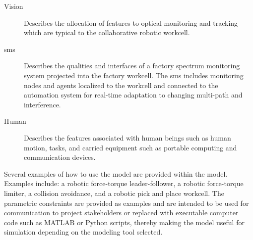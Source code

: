 \begin{description}
\item[Vision] Describes the allocation of features to optical monitoring and tracking which are typical to the collaborative robotic workcell.

\item[\Acrfull{sms}] Describes the qualities and interfaces of a factory spectrum monitoring system projected into the factory workcell.  The \gls{sms} includes monitoring nodes and agents localized to the workcell and connected to the automation system for real-time adaptation to changing multi-path and interference. 

\item[Human] Describes the features associated with human beings such as human motion, tasks, and carried equipment such as portable computing and communication devices.
\vspace{3mm} 

\end{description}

Several examples of how to use the model are provided within the model\cite{Candell2018SysML.GitHub}.  Examples include: a robotic force-torque leader-follower, a robotic force-torque limiter, a collision avoidance, and a robotic pick and place workcell.  The parametric constraints are provided as examples and are intended to be used for communication to project stakeholders or replaced with executable computer code such as MATLAB or Python scripts, thereby making the model useful for simulation depending on the modeling tool selected.

